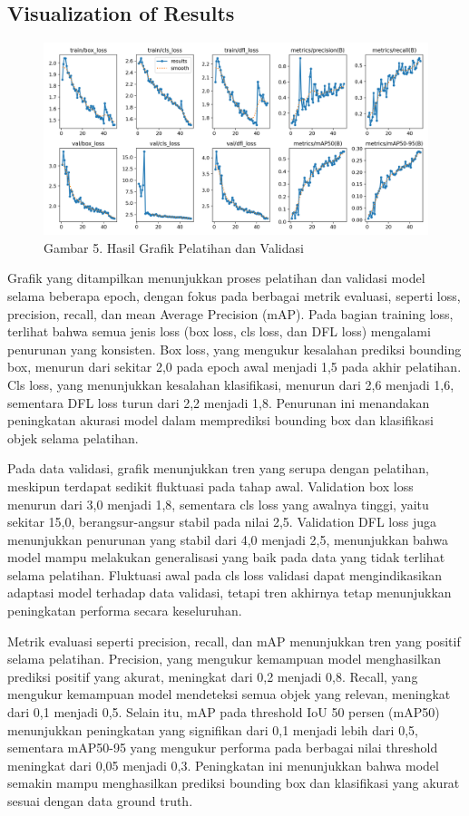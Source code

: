 \documentclass[12pt,a4paper]{article}
\begin{document}
\subsection{Visualization of Results}
\begin{adjustwidth}{3em}{0pt}
\begin{figure}[h]
    \centering
    \includegraphics[width=0.8\linewidth]{Images/results.png}
    \caption*{Gambar 5. Hasil Grafik Pelatihan dan Validasi}
    \label{fig:enter-label}
\end{figure}
\hspace{0.5cm} Grafik yang ditampilkan menunjukkan proses pelatihan dan validasi model selama beberapa epoch, dengan fokus pada berbagai metrik evaluasi, seperti loss, precision, recall, dan mean Average Precision (mAP). Pada bagian training loss, terlihat bahwa semua jenis loss (box loss, cls loss, dan DFL loss) mengalami penurunan yang konsisten. Box loss, yang mengukur kesalahan prediksi bounding box, menurun dari sekitar 2,0 pada epoch awal menjadi 1,5 pada akhir pelatihan. Cls loss, yang menunjukkan kesalahan klasifikasi, menurun dari 2,6 menjadi 1,6, sementara DFL loss turun dari 2,2 menjadi 1,8. Penurunan ini menandakan peningkatan akurasi model dalam memprediksi bounding box dan klasifikasi objek selama pelatihan.

Pada data validasi, grafik menunjukkan tren yang serupa dengan pelatihan, meskipun terdapat sedikit fluktuasi pada tahap awal. Validation box loss menurun dari 3,0 menjadi 1,8, sementara cls loss yang awalnya tinggi, yaitu sekitar 15,0, berangsur-angsur stabil pada nilai 2,5. Validation DFL loss juga menunjukkan penurunan yang stabil dari 4,0 menjadi 2,5, menunjukkan bahwa model mampu melakukan generalisasi yang baik pada data yang tidak terlihat selama pelatihan. Fluktuasi awal pada cls loss validasi dapat mengindikasikan adaptasi model terhadap data validasi, tetapi tren akhirnya tetap menunjukkan peningkatan performa secara keseluruhan.

Metrik evaluasi seperti precision, recall, dan mAP menunjukkan tren yang positif selama pelatihan. Precision, yang mengukur kemampuan model menghasilkan prediksi positif yang akurat, meningkat dari 0,2 menjadi 0,8. Recall, yang mengukur kemampuan model mendeteksi semua objek yang relevan, meningkat dari 0,1 menjadi 0,5. Selain itu, mAP pada threshold IoU 50 persen (mAP50) menunjukkan peningkatan yang signifikan dari 0,1 menjadi lebih dari 0,5, sementara mAP50-95 yang mengukur performa pada berbagai nilai threshold meningkat dari 0,05 menjadi 0,3. Peningkatan ini menunjukkan bahwa model semakin mampu menghasilkan prediksi bounding box dan klasifikasi yang akurat sesuai dengan data ground truth.


\end{adjustwidth}
\end{document}
